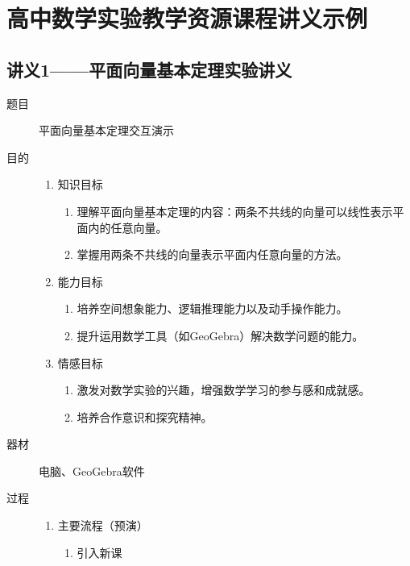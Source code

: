 

\chapter{高中数学实验教学资源课程讲义示例}
\section{讲义1——平面向量基本定理实验讲义}
\begin{description}
  \item[题目] 
    \hspace*{2em} 平面向量基本定理交互演示
  \item[目的] \mbox{} \vspace*{-1.8em}
    \begin{enumerate}
      \item 知识目标
        \begin{enumerate}
          \item 理解平面向量基本定理的内容：两条不共线的向量可以线性表示平面内的任意向量。
          \item 掌握用两条不共线的向量表示平面内任意向量的方法。
        \end{enumerate}
      \item 能力目标
        \begin{enumerate}
          \item 培养空间想象能力、逻辑推理能力以及动手操作能力。
          \item 提升运用数学工具（如GeoGebra）解决数学问题的能力。
        \end{enumerate}
      \item 情感目标
        \begin{enumerate}
          \item 激发对数学实验的兴趣，增强数学学习的参与感和成就感。
          \item 培养合作意识和探究精神。
        \end{enumerate}
    \end{enumerate}
  \item[器材] \hspace*{2em} 电脑、GeoGebra软件
  \item[过程] \mbox{} \vspace{-1.8em}
    \begin{enumerate}[label=(\zhnum*)]
      \item 主要流程（预演）
        \begin{enumerate}[1.]
          \item 引入新课

\end{enumerate}
\end{enumerate}
\end{description}

